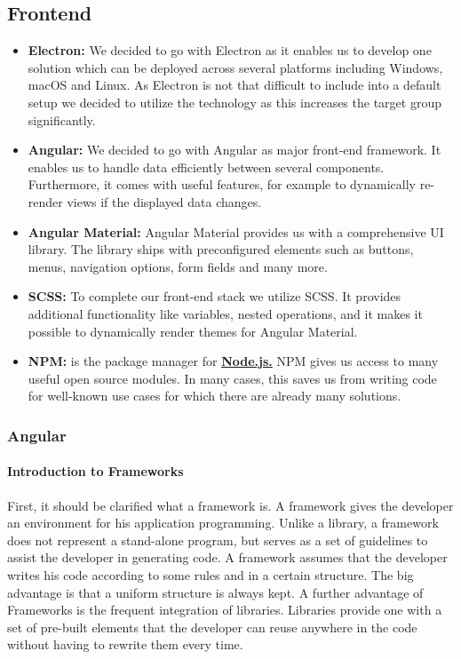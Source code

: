 \subsection{Frontend}\label{subsec:frontend}

\begin{itemize}
    \item \textbf{Electron:} We decided to go with Electron as it enables us to develop one solution which can be
        deployed across several platforms including Windows, macOS and Linux. As Electron is not that difficult to
        include into a default setup we decided to utilize the technology as this increases the target group
        significantly.
    \item \textbf{Angular:} We decided to go with Angular as major front-end framework. It enables us to handle data
        efficiently between several components. Furthermore, it comes with useful features, for example to dynamically
        re-render views if the displayed data changes.
    \item \textbf{Angular Material:} Angular Material provides us with a comprehensive UI library. The library ships
        with preconfigured elements such as buttons, menus, navigation options, form fields and many more.
    \item \textbf{SCSS:} To complete our front-end stack we utilize SCSS. It provides additional functionality like
        variables, nested operations, and it makes it possible to dynamically render themes for Angular Material.
    \item \textbf{NPM:} is the package manager for \hyperref[subsec:backend]{\textbf{Node.js.}} NPM gives us access to many useful open source modules. In many cases, this saves us from writing code for well-known use cases for which there are already many solutions.
\end{itemize}

\subsubsection{Angular}

\paragraph{Introduction to Frameworks}
First, it should be clarified what a framework is. A framework gives the developer an environment for his application programming. Unlike a library, a framework does not represent a stand-alone program, but serves as a set of guidelines to assist the developer in generating code. A framework assumes that the developer writes his code according to some rules and in a certain structure. The big advantage is that a uniform structure is always kept. A further advantage of Frameworks is the frequent integration of libraries. Libraries provide one with a set of pre-built elements that the developer can reuse anywhere in the code without having to rewrite them every time.  


